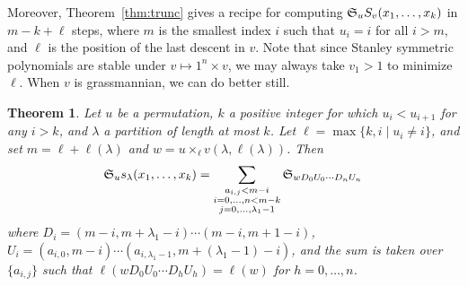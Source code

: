\documentclass[11pt]{amsart}
\newtheorem{theorem}{Theorem}[section]
\theoremstyle{definition}
\theoremstyle{remark}
\numberwithin{equation}{section}
\newcommand{\schubert}{\ensuremath\mathfrak{S}}
\newcommand{\stanley}{\ensuremath{S}}
\begin{document}
Moreover, Theorem~\ref{thm:trunc} gives a recipe for computing $\schubert_u \stanley_v(x_1,\ldots,x_k)$ in $m-k+\ell$ steps, where $m$ is the smallest index $i$ such that $u_i=i$ for all $i>m$, and $\ell$ is the position of the last descent in $v$. Note that since Stanley symmetric polynomials are stable under $v \mapsto 1^n\times v$, we may always take $v_1>1$ to minimize $\ell$. When $v$ is grassmannian, we can do better still.

\begin{theorem}
  Let $u$ be a permutation, $k$ a positive integer for which $u_i < u_{i+1}$ for any $i>k$, and $\lambda$ a partition of length at most $k$. Let $\ell = \max\{k,i \mid u_i \neq i \}$, and set $m = \ell + \ell(\lambda)$ and $w = u\times_{\ell} v(\lambda,\ell(\lambda))$. Then
  \begin{equation}
    \schubert_u s_{\lambda}(x_1,\ldots,x_k) = \sum_{\substack{a_{i,j} < m-i \\ i=0,\ldots,n < m-k \\ j=0,\ldots,\lambda_1-1}} \schubert_{w D_0 U_0 \cdots D_n U_n}
  \end{equation}
  where $D_i = (m-i,m+\lambda_1-i) \cdots (m-i,m+1-i)$, $U_i = (a_{i,0}, m-i) \cdots (a_{i,\lambda_1-1}, m+(\lambda_1-1)-i)$, and the sum is taken over $\{a_{i,j}\}$ such that $\ell(w D_0 U_0 \cdots D_h U_h) = \ell(w)$ for $h=0,\ldots,n$.
  \label{thm:schub-schur}
\end{theorem}
\end{document}
